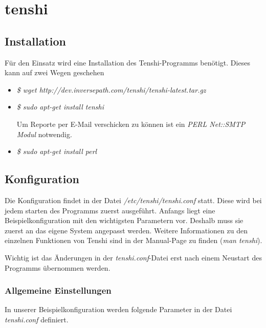 \section{tenshi}
\subsection{Installation}
Für den Einsatz  wird eine Installation des Tenshi-Programms benötigt. Dieses kann auf zwei Wegen geschehen

\begin{itemize}
\item \textit{\$ wget http://dev.inversepath.com/tenshi/tenshi-latest.tar.gz}
\item \textit{\$ sudo apt-get install tenshi}

Um Reporte per E-Mail verschicken zu können ist ein \textit{PERL Net::SMTP Modul}  notwendig.
\item \textit{\$ sudo apt-get install perl}
\end{itemize}
 
\subsection{Konfiguration}
Die Konfiguration findet in der Datei \textit{/etc/tenshi/tenshi.conf} statt. Diese wird bei jedem starten des Programms zuerst ausgeführt. Anfangs liegt eine Beispielkonfiguration mit den wichtigsten Parametern vor. Deshalb muss sie zuerst an das eigene System angepasst werden. Weitere Informationen zu den einzelnen Funktionen von Tenshi sind in der Manual-Page zu finden (\textit{man tenshi}).	

\begin{informationnote}
Wichtig ist das Änderungen in der \textit{tenshi.conf}-Datei erst nach einem Neustart des Programms übernommen werden.
\end{informationnote}

\subsubsection{Allgemeine Einstellungen}
In unserer Beispielkonfiguration werden folgende Parameter in der Datei \textit{tenshi.conf} definiert. 

